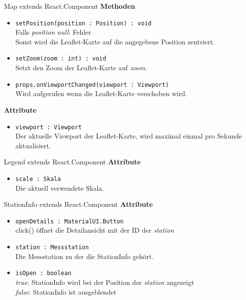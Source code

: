     \begin{Class}{Map extends React.Component}
        \textbf{Methoden}
        \begin{itemize}
            \item \texttt{setPosition(position : Position) : void}
            \\ Falls \emph{position} \emph{null}: Fehler
            \\ Sonst wird die Leaflet-Karte auf die angegebene Position zentriert.
            \item \texttt{setZoom(zoom : int) : void}
            \\ Setzt den Zoom der Leaflet-Karte auf \emph{zoom}.
            \item \texttt{props.onViewportChanged(viewport : Viewport)}
            \\ Wird aufgerufen wenn die Leaflet-Karte verschoben wird.
        \end{itemize}
        \textbf{Attribute}
        \begin{itemize}
            \item \texttt{viewport : Viewport}
            \\ Der aktuelle Viewport der Leaflet-Karte, wird maximal einmal pro Sekunde aktualisiert.
        \end{itemize}
    \end{Class}
    
    \begin{Class}{Legend extends React.Component}
        \textbf{Attribute}
        \begin{itemize}
            \item \texttt{scale : Skala}
            \\ Die aktuell verwendete Skala.
        \end{itemize}
    \end{Class}
    
    \begin{Class}{StationInfo extends React.Component}
        \textbf{Attribute}
        \begin{itemize}
            \item \texttt{openDetails : MaterialUI.Button}
            \\ click() öffnet die Detailansicht mit der ID der \emph{station}
            \item \texttt{station : Messstation}
            \\ Die Messstation zu der die StationInfo gehört.
            \item \texttt{isOpen : boolean}
            \\ \emph{true}: StationInfo wird bei der Position der \emph{station} angezeigt
            \\ \emph{false}: StationInfo ist ausgeblendet
        \end{itemize}
    \end{Class}

